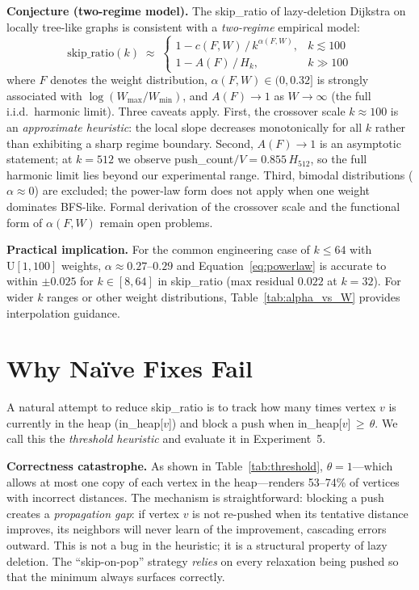 \documentclass[conference]{IEEEtran}
\begin{document}
\noindent\textbf{Conjecture (two-regime model).}
The skip\_ratio of lazy-deletion Dijkstra on locally tree-like graphs is
consistent with a \emph{two-regime} empirical model:
\begin{equation}
\text{skip\_ratio}(k) \;\approx\;
\begin{cases}
  1 - c(F,W)\,/\,k^{\alpha(F,W)}, & k \lesssim 100 \\
  1 - A(F)\,/\,H_k,               & k \gg 100
\end{cases}
\label{eq:tworegime}
\end{equation}
where $F$ denotes the weight distribution,
$\alpha(F,W)\in(0,0.32]$ is strongly associated with $\log(W_{\max}/W_{\min})$,
and $A(F)\to 1$ as $W\to\infty$ (the full i.i.d.\ harmonic limit).
Three caveats apply.
First, the crossover scale $k\approx 100$ is an \emph{approximate heuristic}:
the local slope decreases monotonically for all $k$ rather than
exhibiting a sharp regime boundary.
Second, $A(F)\to 1$ is an asymptotic statement; at $k=512$ we observe
push\_count$/V = 0.855\,H_{512}$, so the full harmonic limit
lies beyond our experimental range.
Third, bimodal distributions ($\alpha\approx 0$) are excluded; the
power-law form does not apply when one weight dominates BFS-like.
Formal derivation of the crossover scale and the functional form of
$\alpha(F,W)$ remain open problems.

\noindent\textbf{Practical implication.}
For the common engineering case of $k\leq 64$ with
$\mathrm{U}[1,100]$ weights, $\alpha\approx 0.27$--$0.29$ and
Equation~\eqref{eq:powerlaw} is accurate to within $\pm 0.025$
for $k\in[8,64]$ in skip\_ratio (max residual $0.022$ at $k=32$).
For wider $k$ ranges or other weight distributions,
Table~\ref{tab:alpha_vs_W} provides interpolation guidance.

\section{Why Na\"ive Fixes Fail}
\label{sec:naivefixes}

A natural attempt to reduce skip\_ratio is to track how many times vertex
$v$ is currently in the heap (in\_heap[$v$]) and block a push when
in\_heap[$v$]\,$\geq\,\theta$.  We call this the \emph{threshold
heuristic} and evaluate it in Experiment~5.

\noindent\textbf{Correctness catastrophe.}
As shown in Table~\ref{tab:threshold}, $\theta=1$---which allows at most
one copy of each vertex in the heap---renders 53--74\% of vertices with
incorrect distances.  The mechanism is straightforward: blocking a push
creates a \emph{propagation gap}: if vertex $v$ is not re-pushed when its
tentative distance improves, its neighbors will never learn of the
improvement, cascading errors outward.  This is not a bug in the
heuristic; it is a structural property of lazy deletion.  The
``skip-on-pop'' strategy \emph{relies} on every relaxation being pushed
so that the minimum always surfaces correctly.
\end{document}
